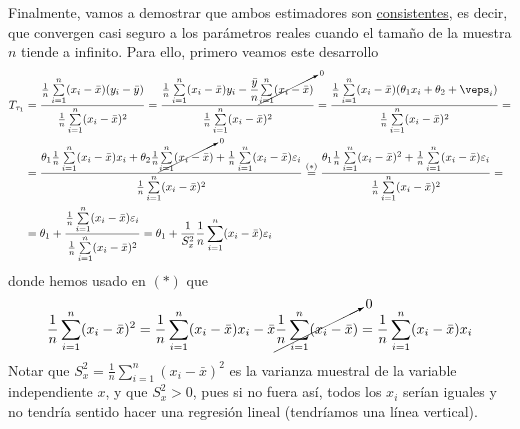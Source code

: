 \noindent
Finalmente, vamos a demostrar que ambos estimadores son \underline{consistentes}, es decir, que convergen casi seguro a los parámetros reales cuando el tamaño de la muestra $n$ tiende a infinito. Para ello, primero veamos este desarrollo
\begin{align*}
    T_{\tau_1} &= \dfrac{\frac{1}{n} \sum\limits_{i=1}^{n} (x_i-\bar{x})(y_i-\bar{y})}{\frac{1}{n} \sum\limits_{i=1}^{n}(x_i-\bar{x})^2} = \dfrac{\frac{1}{n} \sum\limits_{i=1}^{n} (x_i-\bar{x})y_i-  \dfrac{\bar{y}}{n} \cancelto{0}{\sum\limits_{i=1}^{n} (x_i-\bar{x})}}{\frac{1}{n} \sum\limits_{i=1}^{n}(x_i-\bar{x})^2} = \dfrac{\frac{1}{n} \sum\limits_{i=1}^{n} (x_i-\bar{x})(\theta_1x_i+\theta_2+\veps_i)}{\frac{1}{n} \sum\limits_{i=1}^{n}(x_i-\bar{x})^2} = \\
    &= \dfrac{\theta_1 \frac{1}{n} \sum\limits_{i=1}^{n} (x_i-\bar{x})x_i + \theta_2 \frac{1}{n}\cancelto{0}{ \sum\limits_{i=1}^{n} (x_i-\bar{x})} + \frac{1}{n} \sum\limits_{i=1}^{n} (x_i-\bar{x})\varepsilon_i}{\frac{1}{n} \sum\limits_{i=1}^{n}(x_i-\bar{x})^2} \overset{(*)}{=} \dfrac{\theta_1 \frac{1}{n} \sum\limits_{i=1}^{n} (x_i-\bar{x})^2 + \frac{1}{n} \sum\limits_{i=1}^{n} (x_i-\bar{x})\varepsilon_i}{\frac{1}{n} \sum\limits_{i=1}^{n}(x_i-\bar{x})^2} = \\
    &= \theta_1 + \dfrac{\frac{1}{n} \sum\limits_{i=1}^{n} (x_i-\bar{x})\varepsilon_i}{\frac{1}{n} \sum\limits_{i=1}^{n}(x_i-\bar{x})^2}= \theta_1 + \dfrac{1}{S_x^2}\frac{1}{n} \sum\limits_{i=1}^{n} (x_i-\bar{x})\varepsilon_i
\end{align*}
donde hemos usado en $(*)$ que 
\begin{equation*}
    \dfrac{1}{n} \sum\limits_{i=1}^{n} (x_i-\bar{x})^2= \dfrac{1}{n} \sum\limits_{i=1}^{n} (x_i-\bar{x})x_i - \bar{x}\cancelto{0}{\dfrac{1}{n} \sum\limits_{i=1}^{n} (x_i-\bar{x})} = \dfrac{1}{n} \sum\limits_{i=1}^{n} (x_i-\bar{x})x_i
\end{equation*}
Notar que $S_x^2 = \frac{1}{n} \sum\limits_{i=1}^{n}(x_i-\bar{x})^2$ es la varianza muestral de la variable independiente $x$, y que $S_x^2>0$, pues si no fuera así, todos los $x_i$ serían iguales y no tendría sentido hacer una regresión lineal (tendríamos una línea vertical). \\

